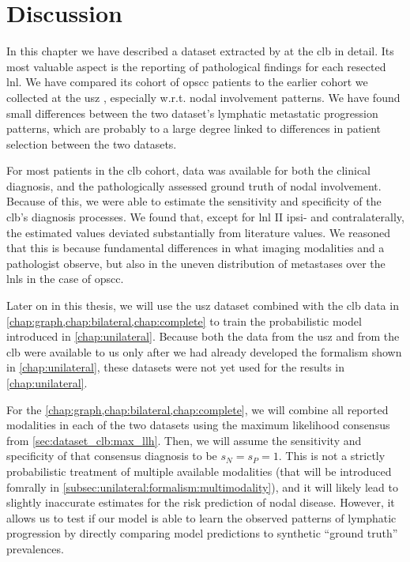 \documentclass[\relativeRoot/main.tex]{subfiles}
\begin{document}
\section{Discussion}
\label{sec:dataset_clb:discussion}

In this chapter we have described a dataset extracted by  at the \gls{clb} in detail. Its most valuable aspect is the reporting of pathological findings for each resected \gls{lnl}. We have compared its cohort of \gls{opscc} patients to the earlier cohort we collected at the \gls{usz} \cite{ludwig_detailed_2021}, especially w.r.t. nodal involvement patterns. We have found small differences between the two dataset's lymphatic metastatic progression patterns, which are probably to a large degree linked to differences in patient selection between the two datasets.

For most patients in the \gls{clb} cohort, data was available for both the clinical diagnosis, and the pathologically assessed ground truth of nodal involvement. Because of this, we were able to estimate the sensitivity and specificity of the \gls{clb}'s diagnosis processes. We found that, except for \gls{lnl} II ipsi- and contralaterally, the estimated values deviated substantially from literature values. We reasoned that this is because fundamental differences in what imaging modalities and a pathologist observe, but also in the uneven distribution of metastases over the \glspl{lnl} in the case of \gls{opscc}.

Later on in this thesis, we will use the \gls{usz} dataset combined with the \gls{clb} data in \cref{chap:graph,chap:bilateral,chap:complete} to train the probabilistic model introduced in \cref{chap:unilateral}. Because both the data from the \gls{usz} and from the \gls{clb} were available to us only after we had already developed the formalism shown in \cref{chap:unilateral}, these datasets were not yet used for the results in \cref{chap:unilateral}.

For the \cref{chap:graph,chap:bilateral,chap:complete}, we will combine all reported modalities in each of the two datasets using the maximum likelihood consensus from \cref{sec:dataset_clb:max_llh}. Then, we will assume the sensitivity and specificity of that consensus diagnosis to be $s_N = s_P = 1$. This is not a strictly probabilistic treatment of multiple available modalities (that will be introduced fomrally in \cref{subsec:unilateral:formalism:multimodality}), and it will likely lead to slightly inaccurate estimates for the risk prediction of nodal disease. However, it allows us to test if our model is able to learn the observed patterns of lymphatic progression by directly comparing model predictions to synthetic ``ground truth'' prevalences.
\end{document}
